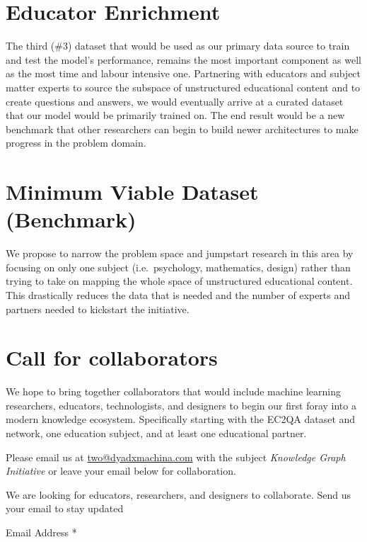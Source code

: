 \documentclass[]{book}
\theoremstyle{definition}
\theoremstyle{definition}
\theoremstyle{definition}
\theoremstyle{remark}
\begin{document}
\section{Educator Enrichment}\label{educator-enrichment}

The third (\#3) dataset that would be used as our primary data source to
train and test the model's performance, remains the most important
component as well as the most time and labour intensive one. Partnering
with educators and subject matter experts to source the subspace of
unstructured educational content and to create questions and answers, we
would eventually arrive at a curated dataset that our model would be
primarily trained on. The end result would be a new benchmark that other
researchers can begin to build newer architectures to make progress in
the problem domain.

\section{Minimum Viable Dataset
(Benchmark)}\label{minimum-viable-dataset-benchmark}

We propose to narrow the problem space and jumpstart research in this
area by focusing on only one subject (i.e.~psychology, mathematics,
design) rather than trying to take on mapping the whole space of
unstructured educational content. This drastically reduces the data that
is needed and the number of experts and partners needed to kickstart the
initiative.

\section{Call for collaborators}\label{call-for-collaborators}

We hope to bring together collaborators that would include machine
learning researchers, educators, technologists, and designers to begin
our first foray into a modern knowledge ecosystem. Specifically starting
with the EC2QA dataset and network, one education subject, and at least
one educational partner.

Please email us at \url{two@dyadxmachina.com} with the subject
\emph{Knowledge Graph Initiative} or leave your email below for
collaboration.

\hypertarget{mc_embed_signup}{}
\hypertarget{mc_embed_signup_scroll}{}
We are looking for educators, researchers, and designers to collaborate.
Send us your email to stay updated

Email Address *
\end{document}
